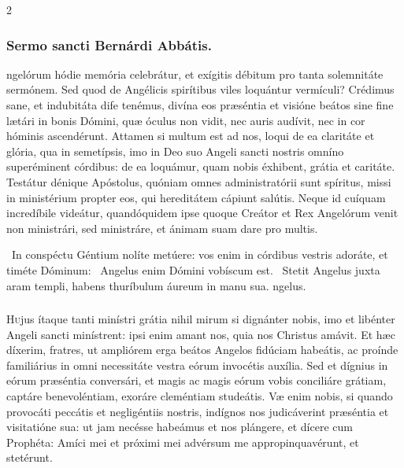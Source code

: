 \documentclass[9pt,twoside]{extarticle}
\begin{document}
\begin{multicols}{2}
\subsubsection*{\center Sermo sancti Bernárdi Abbátis.}
\begin{center}\end{center}
ngelórum hódie memória celebrátur, et exígitis débitum pro tanta solemnitáte sermónem. Sed quod de Angélicis spirítibus viles loquántur vermículi? Crédimus sane, et indubitáta dife tenémus, divína eos præséntia et visióne beátos sine fine lætári in bonis Dómini, quæ óculus non vidit, nec auris audívit, nec in cor hóminis ascendérunt. Attamen si multum est ad nos, loqui de ea claritáte et glória, qua in semetípsis, imo in Deo suo Angeli sancti nostris omníno superéminent córdibus: de ea loquámur, quam nobis éxhibent, grátia et caritáte. Testátur dénique Apóstolus, quóniam omnes administratórii sunt spíritus, missi in ministérium propter eos, qui hereditátem cápiunt salútis. Neque id cuíquam incredíbile videátur, quandóquidem ipse quoque Creátor et Rex Angelórum venit non ministrári, sed ministráre, et ánimam suam dare pro multis.

\begin{tightlist}{}
\item {}~In conspéctu Géntium nolíte metúere: vos enim in córdibus vestris adoráte, et timéte Dóminum: \textred{*}~Angelus enim Dómini vobíscum est. ~Stetit Angelus juxta aram templi, habens thuríbulum áureum in manu sua. ngelus.
\end{tightlist}

\subsubsection*{\center {}}
\lettrine{H}ujus ítaque tanti minístri grátia nihil mirum si dignánter nobis, imo et libénter Angeli sancti minístrent: ipsi enim amant nos, quia nos Christus amávit. Et hæc díxerim, fratres, ut ampliórem erga beátos Angelos fidúciam habeátis, ac proínde familiárius in omni necessitáte vestra eórum invocétis auxília. Sed et dígnius in eórum præséntia conversári, et magis ac magis eórum vobis conciliáre grátiam, captáre benevoléntiam, exoráre cleméntiam studeátis. Væ enim nobis, si quando provocáti peccátis et negligéntiis nostris, indígnos nos judicáverint præséntia et visitatióne sua: ut jam necésse habeámus et nos plángere, et dícere cum Prophéta: Amíci mei et próximi mei advérsum me appropinquavérunt, et stetérunt.


\end{multicols}
\end{document}
